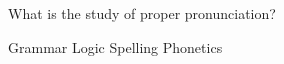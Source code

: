 \documentclass[answers]{exam}
\begin{document}
\begin{center}

\end{center}
\vspace{0.2in}
\begin{questions}
  \question What is the study of proper pronunciation?

  \begin{choices}
    \choice Grammar
    \choice Logic
    \choice Spelling
    \CorrectChoice Phonetics
    
  \end{choices}
\end{questions}
\end{document}
